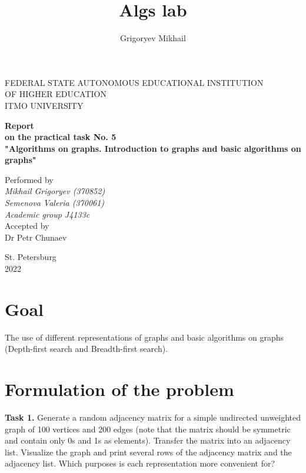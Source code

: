 \documentclass[12pt, a4paper]{article}
\author{Grigoryev Mikhail}
\title{Algs lab}
\begin{document}
\thispagestyle{empty}

\vspace{30mm}

\begin{center}
FEDERAL STATE AUTONOMOUS EDUCATIONAL INSTITUTION \\
OF HIGHER EDUCATION \\
ITMO UNIVERSITY

\vspace{40mm}

{\large \textbf{Report \\
on the practical task No. 5 \\
"Algorithms on graphs. Introduction to graphs and basic algorithms on graphs"}}
\end{center}

\vspace{15mm}

\begin{flushright}
{\large Performed by \\
\textit{Mikhail Grigoryev (370852) \\
Semenova Valeria (370061) \\
Academic group J4133c \\}
Accepted by \\
Dr Petr Chunaev}
\end{flushright}

\vspace{80mm}

\begin{center}
St. Petersburg \\
2022
\end{center}

\newpage

\section*{Goal}

The use of different representations of graphs and basic algorithms on graphs (Depth-first search and Breadth-first search).

\section*{Formulation of the problem}

\textbf{Task 1.} Generate a random adjacency matrix for a simple undirected unweighted graph of 100 vertices and 200 edges (note that the matrix should be symmetric and contain only 0s and 1s as elements). Transfer the matrix into an adjacency list. Visualize the graph and print several rows of the adjacency matrix and the adjacency list. Which purposes is each representation more convenient for?
\end{document}
